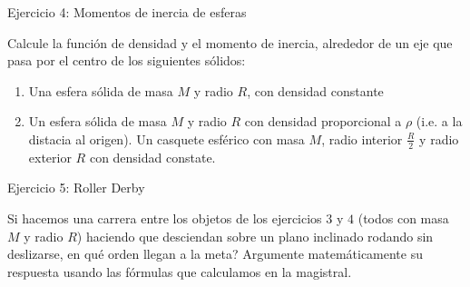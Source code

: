 \documentclass[usepdftitle=false]{beamer}
\begin{document}
\begin{frame}{Ejercicio 4: Momentos de inercia de esferas}

Calcule la funci\'on de densidad y el momento de inercia, alrededor de un eje que pasa por el centro de los siguientes s\'olidos:

\begin{enumerate}
\item Una esfera s\'olida de masa $M$ y radio $R$, con densidad constante
\item Un esfera s\'olida de masa $M$ y radio $R$  con densidad proporcional a $\rho$ (i.e. a la distacia al origen).
\iem Un casquete esf\'erico con masa $M$, radio interior $\frac{R}{2}$ y radio exterior $R$ con densidad constate. 
\end{enumerate}

\end{frame}

\begin{frame}{Ejercicio 5: Roller Derby}

Si hacemos una carrera entre los objetos de los ejercicios $3$ y $4$ (todos con masa $M$ y radio $R$) haciendo que desciendan sobre un plano inclinado rodando sin deslizarse, en qu\'e orden llegan a la meta? Argumente matem\'aticamente su respuesta usando las f\'ormulas que calculamos en la magistral.

\end{frame}
\end{document}
